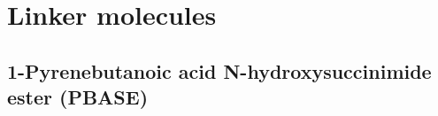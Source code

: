 \documentclass[
  a4paper,
]{scrbook}
\begin{document}
\hypertarget{linker-molecules}{%
\section{Linker molecules}\label{linker-molecules}}

\hypertarget{pyrenebutanoic-acid-n-hydroxysuccinimide-ester-pbase}{%
\subsection{1-Pyrenebutanoic acid N-hydroxysuccinimide ester
(PBASE)}\label{pyrenebutanoic-acid-n-hydroxysuccinimide-ester-pbase}}

\begin{figure}

\begin{minipage}[t]{0.47\linewidth}

{\centering 


}

\end{minipage}%
%
\begin{minipage}[t]{0.05\linewidth}

{\centering 

~

}

\end{minipage}%
%
\begin{minipage}[t]{0.47\linewidth}


\end{minipage}
\end{figure}
\end{document}
